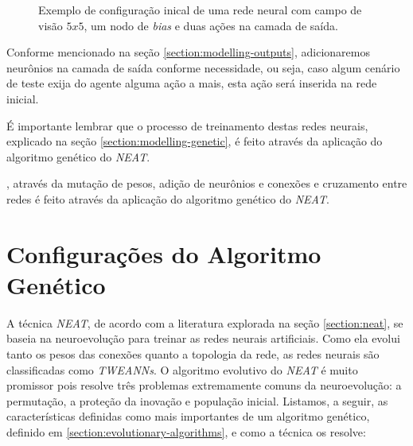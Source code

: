 \begin{figure}[htb!]
	\centering
	\caption{Exemplo de configuração inical de uma rede neural com campo de
	visão $5x5$, um nodo de \textit{bias} e duas ações na camada de saída.}
	\label{fig:modelling-network-example}
\end{figure}

Conforme mencionado na seção \ref{section:modelling-outputs}, adicionaremos
neurônios na camada de saída conforme necessidade, ou seja, caso algum cenário
de teste exija do agente alguma ação a mais, esta ação será inserida na rede
inicial.

É importante lembrar que o processo de treinamento destas redes neurais,
explicado na seção \ref{section:modelling-genetic}, é feito através da aplicação
do algoritmo genético do \textit{NEAT}.

, através
da mutação de pesos, adição de neurônios e conexões e cruzamento entre redes é
feito através da aplicação do algoritmo genético do \textit{NEAT}.


\section{\label{section:modelling-genetic}Configurações do Algoritmo Genético}
A técnica \textit{NEAT}, de acordo com a literatura explorada na seção
\ref{section:neat}, se baseia na neuroevolução para treinar as redes neurais
artificiais. Como ela evolui tanto os pesos das conexões quanto a topologia da
rede, as redes neurais são classificadas como \textit{TWEANNs}. O algoritmo
evolutivo do \textit{NEAT} é muito promissor pois resolve três problemas
extremamente comuns da neuroevolução: a permutação, a proteção da inovação e
população inicial. Listamos, a seguir, as características definidas como mais
importantes de um algoritmo genético, definido em
\ref{section:evolutionary-algorithms}, e como a técnica os resolve:

